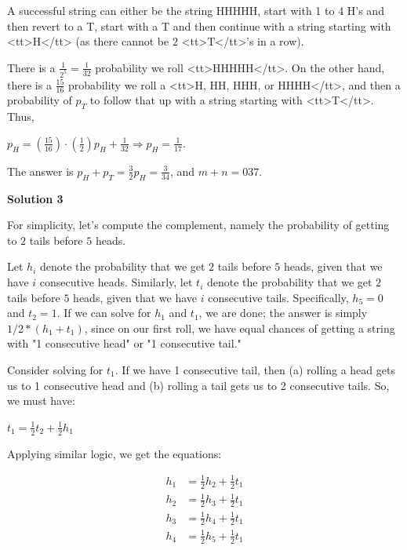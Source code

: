 \begin{enumerate}
 A successful string can either be the string HHHHH, start with 1 to 4 H's and then revert to a T, start with a T and then continue with a string starting with <tt>H</tt> (as there cannot be $2$ <tt>T</tt>'s in a row).

 There is a $\frac{1}{2^5} = \frac{1}{32}$ probability we roll <tt>HHHHH</tt>. On the other hand, there is a $\frac{15}{16}$ probability we roll a <tt>H, HH, HHH, or HHHH</tt>, and then a probability of $p_T$ to follow that up with a string starting with <tt>T</tt>. Thus, 

 $p_H = \left(\frac{15}{16}\right) \cdot \left(\frac 12\right) p_H + \frac{1}{32} \Longrightarrow p_H = \frac{1}{17}.$

 The answer is $p_H + p_T = \frac{3}{2}p_H = \frac{3}{34}$, and $m+n = \boxed{037}$.

 



\textbf{Solution 3}

For simplicity, let's compute the complement, namely the probability of getting to $2$ tails before $5$ heads.

 Let $h_{i}$ denote the probability that we get $2$ tails before $5$ heads, given that we have $i$ consecutive heads. Similarly, let $t_{i}$ denote the probability that we get $2$ tails before $5$ heads, given that we have $i$ consecutive tails. Specifically, $h_{5} = 0$ and $t_{2} = 1$. If we can solve for $h_{1}$ and $t_{1}$, we are done; the answer is simply $1/2 * (h_{1} + t_{1})$, since on our first roll, we have equal chances of getting a string with "1 consecutive head" or "1 consecutive tail."

 Consider solving for $t_{1}$. If we have 1 consecutive tail, then (a) rolling a head gets us to 1 consecutive head and (b) rolling a tail gets us to 2 consecutive tails. So, we must have:

 $t_{1} = \frac{1}{2} t_{2} + \frac{1}{2} h_{1}$

 

 Applying similar logic, we get the equations:

 
 \begin{align*} h_{1} &= \frac{1}{2} h_{2} + \frac{1}{2} t_{1}\\ h_{2} &= \frac{1}{2} h_{3} + \frac{1}{2} t_{1}\\ h_{3} &= \frac{1}{2} h_{4} + \frac{1}{2} t_{1}\\ h_{4} &= \frac{1}{2} h_{5} + \frac{1}{2} t_{1} \end{align*}



\end{enumerate}
